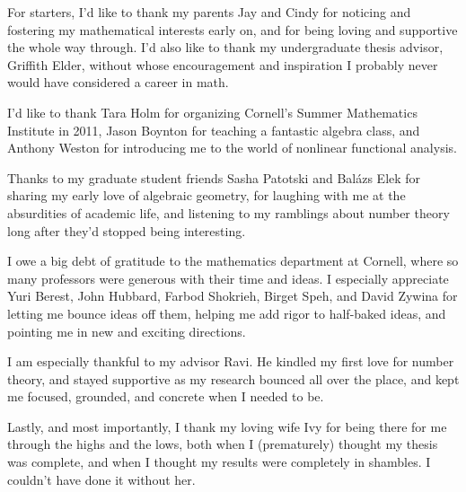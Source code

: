 \documentclass[phd,cornellheadings]{cornell}
\begin{document}
\begin{acknowledgements}
For starters, I'd like to thank my parents Jay and Cindy for noticing and 
fostering my mathematical interests early on, and for being loving and 
supportive the whole way through. I'd also like to thank my undergraduate 
thesis advisor, Griffith Elder, without whose encouragement and inspiration 
I probably never would have considered a career in math. 

I'd like to thank Tara Holm for organizing Cornell's Summer Mathematics 
Institute in 2011, Jason Boynton for teaching a fantastic algebra class, and 
Anthony Weston for introducing me to the world of nonlinear functional 
analysis. 

Thanks to my graduate student friends Sasha Patotski and Bal\'azs Elek for 
sharing my early love of algebraic geometry, for laughing with me at the 
absurdities of academic life, and listening to my ramblings about number 
theory long after they'd stopped being interesting. 

I owe a big debt of gratitude to the mathematics department at Cornell, where 
so many professors were generous with their time and ideas. I especially 
appreciate Yuri Berest, John Hubbard, Farbod Shokrieh, Birget Speh, and David 
Zywina for letting me bounce ideas off them, helping me add rigor to 
half-baked ideas, and pointing me in new and exciting directions. 

I am especially thankful to my advisor Ravi. He kindled my first love for 
number theory, and stayed supportive as my research bounced all over the place, 
and kept me focused, grounded, and concrete when I needed to be. 

Lastly, and most importantly, I thank my loving wife Ivy for being there for me 
through the highs and the lows, both when I (prematurely) thought my thesis was 
complete, and when I thought my results were completely in shambles. I couldn't 
have done it without her. 
\end{acknowledgements}

\contentspage

\normalspacing
\setcounter{page}{1}
\pagestyle{cornell}













%






\printbibliography[heading=bibintoc]
\end{document}
